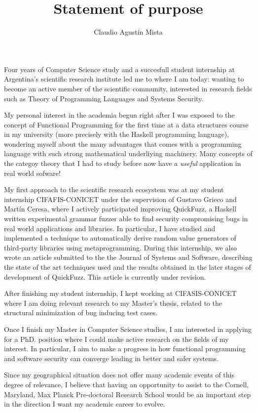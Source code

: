 \documentclass[helvetica,openbib,logo,notitle,flagCMYK,totpages]{europecv}
\title{Statement of purpose}
\author{Claudio Agust\'in Mista}
\date{}
\begin{document}

\maketitle 
   
    Four years of Computer Science study and a succesfull student internship at
    Argentina's scientific research institute led me to where I am today:
    wanting to become an active member of the scientific community, interested
    in research fields such as Theory of Programming Languages and Systems
    Security. 

    My personal interest in the academia begun right after I was exposed to the
    concept of Functional Programming for the first time at a data structures
    course in my university (more precisely with the Haskell programming
    language), wondering myself about the many advantages that comes with a
    programming language with such strong mathematical underliying machinery.
    Many concepts of the categoy theory that I had to study before now have a
    \emph{useful} application in real world sofware! 

    My first approach to the scientific research ecosystem was at my student
    internship CIFAFIS-CONICET under the supervision of Gustavo Grieco and
    Mart\'in Ceresa, where I actively participated improving QuickFuzz, a
    Haskell written experimental grammar fuzzer able to find security
    compromising bugs in real world applications and libraries. In particular,
    I have studied and implemented a technique to automatically derive random
    value generators of third-party libraries using metaprogramming. During
    this internship, we also wrote an article submitted to the the Journal of
    Systems and Software, describing the state of the art techniques used and
    the results obtained in the later stages of development of QuickFuzz. This
    article is currently under revision. 

    After finishing my student internship, I kept working at CIFASIS-CONICET
    where I am doing relevant research to my Master's thesis, related to the
    structural minimization of bug inducing test cases.   

    Once I finish my Master in Computer Science studies, I am interested in
    applying for a PhD. position where I could make active research on the
    fields of my interest. In particular, I aim to make a progress in how
    functional programming and software security can converge leading in better
    and safer systems. 

    Since my geographical situation does not offer many academic events of this
    degree of relevance, I believe that having an opportunity to assist to the
    Cornell, Maryland, Max Planck Pre-doctoral Research School would be an
    important step in the direction I want my academic career to evolve.
\end{document}
